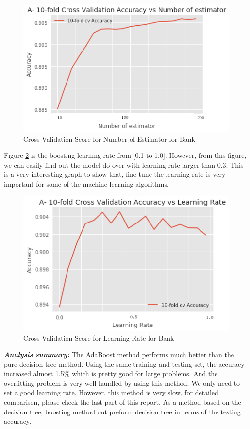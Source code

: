 \documentclass[10pt, conference, compsocconf]{IEEEtran}
\begin{document}
\begin{figure}[h]
	\centering
	\includegraphics[scale = 0.5]{image/bank_abd_cross_est.png}
	\caption{Cross Validation Score for Number of Estimator for Bank}
	\label{fig:bank_abd_cros_est}
\end{figure}

Figure \ref{fig:bank_abd_cros_rate} is the boosting learning rate from [0.1 to 1.0]. However, from this figure, we can easily find out the model do over with learning rate larger than 0.3. This is a very interesting graph to show that, fine tune the learning rate is very important for some of the machine learning algorithms. 

\begin{figure}[h]
	\centering
	\includegraphics[scale = 0.5]{image/bank_abd_cross_rate.png}
	\caption{Cross Validation Score for Learning Rate for Bank}
	\label{fig:bank_abd_cros_rate}
\end{figure}

\textit{\textbf{Analysis summary:}} The AdaBoost method performs much better than the pure decision tree method. Using the same training and testing set, the accuracy increased almost 1.5\% which is pretty good for large problems. And the overfitting problem is very well handled by using this method. We only need to set a good learning rate. However, this method is very slow, for detailed comparison, please check the last part of this report. As a method based on the decision tree, boosting method out preform decision tree in terms of the testing accuracy. 
\end{document}
